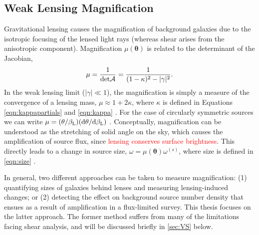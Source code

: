 
\subsection{Weak Lensing Magnification}
\label{sec:Mag}

Gravitational lensing causes the magnification of background galaxies due to the isotropic focusing of the lensed light rays (whereas shear arises from the anisotropic component). Magnification $\mu(\bm{\theta})$ is related to the determinant of the Jacobian, 
\begin{equation}
\mu  = \frac{1}{{\rm det}{\cal A}} = \frac{1}{(1-\kappa)^2 - |\gamma|^2}.
\end{equation}
In the weak lensing limit ($|\gamma| \ll 1$), the magnification is simply a measure of the convergence of a lensing mass, $\mu \approx 1+2\kappa$, where $\kappa$ is defined in Equations \ref{eqn:kappapartials} and \ref{eqn:kappa} \citep{Schneider06_IntroGravLensCosmology}. For the case of circularly symmetric sources we can write $\mu = (\theta/\beta_{\rm L})({\rm d}\theta/{\rm d}\beta_{\rm L})$
\citep{NarayanBartelmann96}. Conceptually, magnification can be understood as the stretching of solid angle on the sky, which causes the amplification of source flux, since \textcolor{red}{lensing conserves surface brightness}. This directly leads to a change in source size, $\omega = \mu(\bm{\theta}) \omega^{(s)}$, where size is defined in \autoref{eqn:size} \citep{BS01}.

In general, two different approaches can be taken to measure magnification: (1) quantifying sizes of galaxies behind lenses and measuring lensing-induced changes; or (2) detecting the effect on background source number density that ensues as a result of amplification in a flux-limited survey. This thesis focuses on the latter approach. The former method suffers from many of the limitations facing shear analysis, and will be discussed briefly in \autoref{sec:VS} below. 

